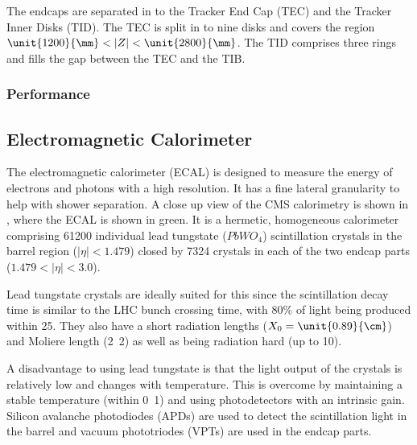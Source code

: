 The endcaps are separated in to the Tracker End Cap (TEC) and the Tracker Inner
Disks (TID). The TEC is split in to nine disks and covers the region
$\unit{1200}{\mm} < |Z| < \unit{2800}{\mm}$. The TID comprises three rings
and fills the gap between the TEC and the TIB.

\subsubsection{Performance}




\subsection{Electromagnetic Calorimeter}
The electromagnetic calorimeter (ECAL) is 
designed to measure the energy of
electrons and photons with a high resolution.
It has a fine lateral granularity to help with shower separation. 
A close up view of the CMS calorimetry is shown in , where the
ECAL is shown in green.
It is a hermetic, homogeneous calorimeter comprising 61200 individual lead
tungstate ($PbWO_{4}$) scintillation crystals in the barrel region
($|\eta|<1.479$) closed by 7324 crystals in each of the two endcap parts
($1.479<|\eta|<3.0$).


Lead tungstate crystals are ideally suited for this since the scintillation
decay time is similar to the LHC bunch crossing time, 
with \unit{80}{\%} of light being produced within \unit{25}{\ns}.
They also have a short radiation lengths ($X_0=\unit{0.89}{\cm}$) 
and Moliere length (\unit{2.2}{\cm}) as well as being radiation hard
(up to \unit{10}{\mrad}).

A disadvantage to using lead tungstate is that the light output of the crystals
is relatively low and changes with temperature. This is overcome by maintaining
a stable temperature (within \unit{0.1}{\degreecelsius}) and using
photodetectors with an intrinsic gain.
Silicon avalanche photodiodes (APDs) are used to detect the scintillation light
in the barrel and vacuum phototriodes (VPTs) are used in the endcap parts.

